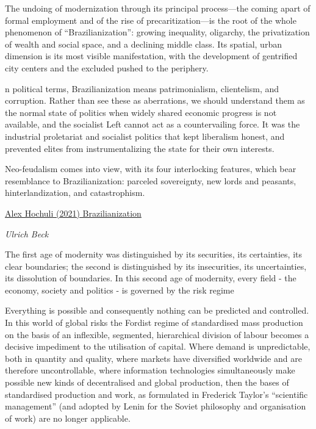 \documentclass[
]{book}
\begin{document}
The undoing of modernization through its principal process---the coming apart of formal employment and of the rise of precaritization---is the root of the whole phenomenon of ``Brazilianization'': growing inequality, oligarchy, the privatization of wealth and social space, and a declining middle class. Its spatial, urban dimension is its most visible manifestation, with the development of gentrified city centers and the excluded pushed to the periphery.

n political terms, Brazilianization means patrimonialism, clientelism, and corruption. Rather than see these as aberrations, we should understand them as the normal state of politics when widely shared economic progress is not available, and the socialist Left can­not act as a countervailing force. It was the industrial proletariat and socialist politics that kept liberalism honest, and prevented elites from instrumentalizing the state for their own interests.

Neo-feudalism comes into view, with its four interlocking features, which bear resemblance to Brazilianization: parceled sovereignty, new lords and peasants, hinterlandization, and catastrophism.

\href{https://americanaffairsjournal.org/2021/05/the-brazilianization-of-the-world/}{Alex Hochuli (2021) Brazilianization}

\emph{Ulrich Beck}

The first age of modernity was distinguished by its securities, its certainties, its clear boundaries; the second is distinguished by its insecurities, its uncertainties, its dissolution of boundaries. In this second age of modernity, every field - the economy, society and politics - is governed by the risk regime

Everything is possible and consequently nothing can be predicted and controlled. In this world of global risks the Fordist regime of standardised mass production on the basis of an inflexible, segmented, hierarchical division of labour becomes a decisive impediment to the utilisation of capital. Where demand is unpredictable, both in quantity and quality, where markets have diversified worldwide and are therefore uncontrollable, where information technologies simultaneously make possible new kinds of decentralised and global production, then the bases of standardised production and work, as formulated in Frederick Taylor's ``scientific management'' (and adopted by Lenin for the Soviet philosophy and organisation of work) are no longer applicable.
\end{document}
